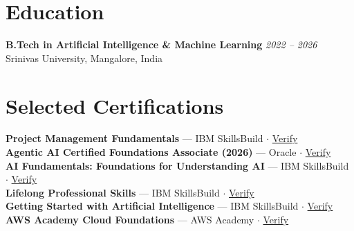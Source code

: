 \documentclass[10pt,letterpaper]{article}
\begin{document}
\section{Education}
\textbf{B.Tech in Artificial Intelligence \& Machine Learning}
\hfill \textit{2022 -- 2026}\\
Srinivas University, Mangalore, India

\section{Selected Certifications}
\textbf{Project Management Fundamentals} --- IBM SkillsBuild $\cdot$ \href{https://www.credly.com/go/cRerp16F}{Verify}\\[3pt]
\textbf{Agentic AI Certified Foundations Associate (2026)} --- Oracle $\cdot$ \href{https://catalog-education.oracle.com/ords/certview/sharebadge?id=EACAB45EE430A4B4A1B078E0E4474E90C71C0664D7FA65D30BE1E6E478DA0BC4}{Verify}\\[3pt]
\textbf{AI Fundamentals: Foundations for Understanding AI} --- IBM SkillsBuild $\cdot$ \href{https://www.credly.com/badges/579477ca-6196-45c8-a9f5-2c9621c98f17/public\_url}{Verify}\\[3pt]
\textbf{Lifelong Professional Skills} --- IBM SkillsBuild $\cdot$ \href{https://www.credly.com/go/nuD07vsk}{Verify}\\[3pt]
\textbf{Getting Started with Artificial Intelligence} --- IBM SkillsBuild $\cdot$ \href{https://www.credly.com/badges/de0e7fd4-8593-48c7-95f6-104af1769c4e/linked\_in?t=t3kl17}{Verify}\\[3pt]
\textbf{AWS Academy Cloud Foundations} --- AWS Academy $\cdot$ \href{https://www.credly.com/badges/850a46b9-cd01-46eb-a853-35550567b86c/linked\_in?t=t3kloq}{Verify}
\end{document}
